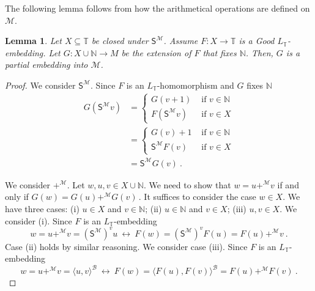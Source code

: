 \documentclass[10pt,a4paper, openany,  oldfontcommands]{memoir}
\newtheorem{lemma} [theorem] {Lemma}
\newtheorem{open problem} [theorem] {Open Problem}
\newtheorem{open question} [theorem] {Open Question}
\renewcommand{\mathrm}{\mathsf}
\begin{document}
The following lemma follows from  how the arithmetical operations are defined on  $   \mathcal{M}  $. 

\begin{lemma}
Let   $ X  \subseteq  \mathbb{T}  $ be closed under   $  \mathrm{S}^{  \mathcal{M}  }    $. 
Assume   $  F :    X \to  \mathbb{T} $  is a  \textsf{Good}  $ L_{  \mathbb{T} } $-embedding. 
Let  $  G  :  X  \cup  \mathbb{N} \to  M  $  be the extension of  $F$ that fixes  $ \mathbb{N}   $. 
Then,  $G$ is a partial embedding  into   $  \mathcal{M} $. 
\end{lemma}
\begin{proof}

We consider  $  \mathrm{S}^{  \mathcal{M}  }  $. 
Since    $F$ is an $  L_{  \mathbb{T}  }  $-homomorphism and  $G$  fixes  $  \mathbb{N} $  
\begin{align*}
G  \left(  \mathrm{S}^{  \mathcal{M}  }   v   \right)    &=    \begin{cases} 
G  \left(  v +  1 \right)          &  \mbox{  if  }   v  \in  \mathbb{N}
 \\
 F  \left(  \mathrm{S}^{  \mathcal{M}  }    v   \right)    &   \mbox{ if  }   v  \in X  
  \end{cases} 
  \\
  & = 
   \begin{cases} 
G  \left(  v  \right)  +  1      &       \mbox{  if  }   v  \in  \mathbb{N}
 \\
  \mathrm{S}^{  \mathcal{M}  }   F (v)    &   \mbox{ if  }   v  \in X  
  \end{cases} 
  \\
  & =    \mathrm{S}^{  \mathcal{M}  }   G(v) 
  \        .
\end{align*}  








We consider  $  +^{  \mathcal{M}  }   $. 
Let  $  w, u,  v  \in    X  \cup  \mathbb{N}  $. 
We need to show that  $  w  =  u   +^{  \mathcal{M}  }   v  $  if and only if  $  G(w)  =G(u)     +^{  \mathcal{M}  }  G(v)   \,   $.
It  suffices to consider the case   $  w  \in  X  $. 
We have three cases:  
(i)  $  u  \in  X  $  and  $  v  \in  \mathbb{N} $; 
(ii) $  u  \in  \mathbb{N}  $  and  $  v  \in  X  $; 
(iii)  $  u,  v  \in  X  $. 
We consider (i). 
Since  $F$ is an  $ L_{  \mathbb{T} } $-embedding 
\[
 w  =     u   +^{  \mathcal{M}  }   v  =   \left(  \mathrm{S}^{ \mathcal{M}  }  \right)^v  u  
 \   \leftrightarrow   \    
F ( w )  =
\left(  \mathrm{S}^{ \mathcal{M}  }  \right)^v    F(u)  
= 
F(u)  +^{  \mathcal{M}  }  v
\   . 
\]
Case (ii) holds by similar reasoning. 
We consider case (iii). 
Since  $F$ is an  $ L_{  \mathbb{T} } $-embedding
\[
 w  =  u   +^{  \mathcal{M}  }   v  =  \langle  u,  v   \rangle^{  \mathcal{B}  } 
 \     \leftrightarrow    \  
F(w)   =   \langle  F( u) ,   F (v)    \rangle^{  \mathcal{B}  }   =  F(u)   +^{  \mathcal{M}  }    F( v) 
\       .
\]






\end{proof}
\end{document}

